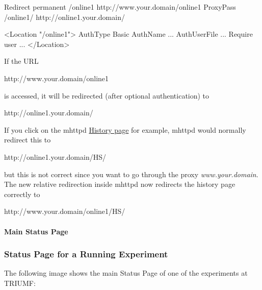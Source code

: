 \begin{DoxyCode}
Redirect permanent /online1 http://www.your.domain/online1
ProxyPass /online1/  http://online1.your.domain/

<Location "/online1">
  AuthType Basic
  AuthName ...
  AuthUserFile ...
  Require user ...
</Location>
\end{DoxyCode}


If the URL 
\begin{DoxyCode}
http://www.your.domain/online1
\end{DoxyCode}
 is accessed, it will be redirected (after optional authentication) to 
\begin{DoxyCode}
http://online1.your.domain/
\end{DoxyCode}
 \par
 If you click on the mhttpd \hyperlink{RC_mhttpd_History_page}{History page} for example, mhttpd would normally redirect this to 
\begin{DoxyCode}
http://online1.your.domain/HS/
\end{DoxyCode}
 but this is not correct since you want to go through the proxy {\itshape www.your.domain\/}. The new relative redirection inside mhttpd now redirects the history page correctly to 
\begin{DoxyCode}
http://www.your.domain/online1/HS/
\end{DoxyCode}


\label{index_end}
\hypertarget{index_end}{}
 \par
  \paragraph{Main Status Page}\label{RC_mhttpd_Main_Status_page}
\label{RC_mhttpd_status_page_redesign_idx_mhttpd_page_status}
\hypertarget{RC_mhttpd_status_page_redesign_idx_mhttpd_page_status}{}


\par


 \par


\label{RC_mhttpd_Main_Status_page_RC_mhttpd_main_status}
\hypertarget{RC_mhttpd_Main_Status_page_RC_mhttpd_main_status}{}
 \hypertarget{RC_mhttpd_Main_Status_page_RC_mhttpd_msp_customized}{}\subsubsection{Status Page for a Running Experiment}\label{RC_mhttpd_Main_Status_page_RC_mhttpd_msp_customized}
The following image shows the main Status Page of one of the experiments at TRIUMF:

